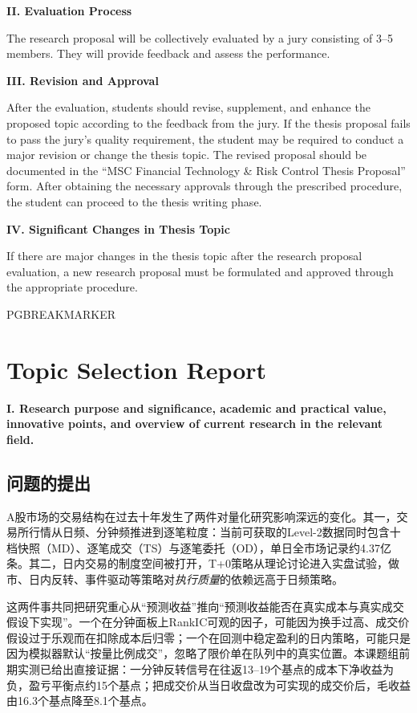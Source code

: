 \documentclass[11pt,a4paper]{article}
\begin{document}
\textbf{II. Evaluation Process}

The research proposal will be collectively evaluated by a jury consisting of 3--5 members. They will provide feedback and assess the performance.

\textbf{III. Revision and Approval}

After the evaluation, students should revise, supplement, and enhance the proposed topic according to the feedback from the jury. If the thesis proposal fails to pass the jury's quality requirement, the student may be required to conduct a major revision or change the thesis topic. The revised proposal should be documented in the ``MSC Financial Technology \& Risk Control Thesis Proposal'' form. After obtaining the necessary approvals through the prescribed procedure, the student can proceed to the thesis writing phase.

\textbf{IV. Significant Changes in Thesis Topic}

If there are major changes in the thesis topic after the research proposal evaluation, a new research proposal must be formulated and approved through the appropriate procedure.


PGBREAKMARKER

\section*{Topic Selection Report}

{\raggedright \textbf{I. Research purpose and significance, academic and practical value, innovative points, and overview of current research in the relevant field.}\par}

\subsection*{问题的提出}

A股市场的交易结构在过去十年发生了两件对量化研究影响深远的变化。其一，交易所行情从日频、分钟频推进到逐笔粒度：当前可获取的Level-2数据同时包含十档快照（MD）、逐笔成交（TS）与逐笔委托（OD），单日全市场记录约4.37亿条。其二，日内交易的制度空间被打开，T+0策略从理论讨论进入实盘试验，做市、日内反转、事件驱动等策略对\emph{执行质量}的依赖远高于日频策略。

这两件事共同把研究重心从``预测收益''推向``预测收益能否在真实成本与真实成交假设下实现''。一个在分钟面板上RankIC可观的因子，可能因为换手过高、成交价假设过于乐观而在扣除成本后归零；一个在回测中稳定盈利的日内策略，可能只是因为模拟器默认``按量比例成交''，忽略了限价单在队列中的真实位置。本课题组前期实测已给出直接证据：一分钟反转信号在往返13--19个基点的成本下净收益为负，盈亏平衡点约15个基点；把成交价从当日收盘改为可实现的成交价后，毛收益由16.3个基点降至8.1个基点。
\end{document}
